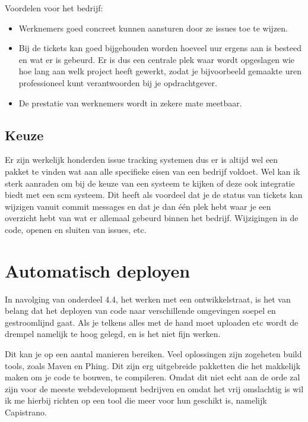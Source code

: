 Voordelen voor het bedrijf:

\begin{itemize}
  \item Werknemers goed concreet kunnen aansturen door ze issues toe te wijzen.
  \item Bij de tickets kan goed bijgehouden worden hoeveel uur ergens aan is besteed en wat er is gebeurd. Er is dus een centrale plek waar wordt opgeslagen wie hoe lang aan welk project heeft gewerkt, zodat je bijvoorbeeld gemaakte uren professioneel kunt verantwoorden bij je opdrachtgever.
  \item De prestatie van werknemers wordt in zekere mate meetbaar.
\end{itemize}

\subsection{Keuze}

Er zijn werkelijk honderden issue tracking systemen\cite{issuetracking} dus er is altijd wel een pakket te vinden wat aan alle specifieke eisen van een bedrijf voldoet. Wel kan ik sterk aanraden om bij de keuze van een systeem te kijken of deze ook integratie biedt met een {\sc scm} systeem. Dit heeft als voordeel dat je de status van tickets kan wijzigen vanuit commit messages en dat je dan \'{e}\'{e}n plek hebt waar je een overzicht hebt van wat er allemaal gebeurd binnen het bedrijf. Wijzigingen in de code, openen en sluiten van issues, etc.

\section{Automatisch deployen}

In navolging van onderdeel 4.4, het werken met een ontwikkelstraat, is het van belang dat het deployen van code naar verschillende omgevingen soepel en gestroomlijnd gaat. Als je telkens alles met de hand moet uploaden etc wordt de drempel namelijk te hoog gelegd, en is het niet fijn werken.

Dit kan je op een aantal manieren bereiken. Veel oplossingen zijn zogeheten build tools, zoals Maven\cite{maven} en Phing\cite{phing}. Dit zijn erg uitgebreide pakketten die het makkelijk maken om je code te bouwen, te compileren. Omdat dit niet echt aan de orde zal zijn voor de meeste webdevelopment bedrijven en omdat het vrij omslachtig is wil ik me hierbij richten op een tool die meer voor hun geschikt is, namelijk Capistrano\cite{capistrano}.


